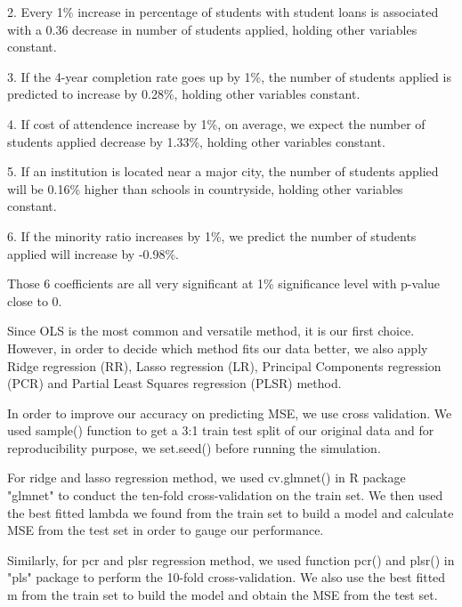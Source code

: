 \documentclass{article}
\begin{document}
2. Every 1\% increase in percentage of students with student loans is associated with a 0.36 decrease in number of students applied, holding other variables constant.

3. If the 4-year completion rate goes up by 1\%, the number of students applied is predicted to increase by 0.28\%, holding other variables constant.

4. If cost of attendence increase by 1\%, on average, we expect the number of students applied decrease by 1.33\%, holding other variables constant.

5. If an institution is located near a major city, the number of students applied will be 0.16\% higher than schools in countryside, holding other variables constant.

6. If the minority ratio increases by 1\%, we predict the number of students applied will increase by -0.98\%.

Those 6 coefficients are all very significant at 1\% significance level with p-value close to 0.

Since OLS is the most common and versatile method, it is our first choice. However, in order to decide which method fits our data better, we also apply Ridge regression (RR), Lasso regression (LR), Principal Components regression (PCR) and Partial Least Squares regression (PLSR) method.

In order to improve our accuracy on predicting MSE, we use cross validation. We used sample() function to get a 3:1 train test split of our original data and for reproducibility purpose, we set.seed() before running the simulation.

For ridge and lasso regression method, we used cv.glmnet() in R package "glmnet" to conduct the ten-fold cross-validation on the train set. We then used the best fitted lambda we found from the train set to build a model and calculate MSE from the test set in order to gauge our performance.

Similarly, for pcr and plsr regression method, we used function pcr() and plsr() in "pls" package to perform the 10-fold cross-validation. We also use the best fitted m from the train set to build the model and obtain the MSE from the test set.
\end{document}
